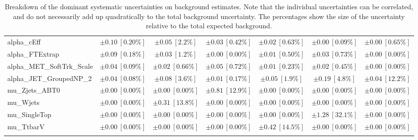 \begin{sidewaystable}
\begin{center}
\begin{tabular*}{\textwidth}{@{\extracolsep{\fill}}lcccccc}
alpha\_cEff         & $\pm 0.10\ [0.20\%] $          & $\pm 0.05\ [2.2\%] $          & $\pm 0.03\ [0.42\%] $          & $\pm 0.02\ [0.63\%] $          & $\pm 0.00\ [0.09\%] $          & $\pm 0.00\ [0.65\%] $       \\
alpha\_FTExtrap         & $\pm 0.09\ [0.18\%] $          & $\pm 0.03\ [1.2\%] $          & $\pm 0.00\ [0.00\%] $          & $\pm 0.01\ [0.50\%] $          & $\pm 0.03\ [0.73\%] $          & $\pm 0.00\ [0.00\%] $       \\
alpha\_MET\_SoftTrk\_Scale         & $\pm 0.04\ [0.09\%] $          & $\pm 0.02\ [0.66\%] $          & $\pm 0.05\ [0.72\%] $          & $\pm 0.01\ [0.23\%] $          & $\pm 0.02\ [0.45\%] $          & $\pm 0.00\ [0.00\%] $       \\
alpha\_JET\_GroupedNP\_2         & $\pm 0.04\ [0.08\%] $          & $\pm 0.08\ [3.6\%] $          & $\pm 0.01\ [0.17\%] $          & $\pm 0.05\ [1.9\%] $          & $\pm 0.19\ [4.8\%] $          & $\pm 0.04\ [12.2\%] $       \\
mu\_Zjets\_ABT0         & $\pm 0.00\ [0.00\%] $          & $\pm 0.00\ [0.00\%] $          & $\pm 0.81\ [12.9\%] $          & $\pm 0.00\ [0.00\%] $          & $\pm 0.00\ [0.00\%] $          & $\pm 0.00\ [0.00\%] $       \\
mu\_Wjets         & $\pm 0.00\ [0.00\%] $          & $\pm 0.31\ [13.8\%] $          & $\pm 0.00\ [0.00\%] $          & $\pm 0.00\ [0.00\%] $          & $\pm 0.00\ [0.00\%] $          & $\pm 0.00\ [0.00\%] $       \\
mu\_SingleTop         & $\pm 0.00\ [0.00\%] $          & $\pm 0.00\ [0.00\%] $          & $\pm 0.00\ [0.00\%] $          & $\pm 0.00\ [0.00\%] $          & $\pm 1.28\ [32.1\%] $          & $\pm 0.00\ [0.00\%] $       \\
mu\_TtbarV         & $\pm 0.00\ [0.00\%] $          & $\pm 0.00\ [0.00\%] $          & $\pm 0.00\ [0.00\%] $          & $\pm 0.42\ [14.5\%] $          & $\pm 0.00\ [0.00\%] $          & $\pm 0.00\ [0.00\%] $       \\
\noalign{\smallskip}\hline\noalign{\smallskip}
\end{tabular*}
\end{center}
\caption[Breakdown of uncertainty on background estimates]{
Breakdown of the dominant systematic uncertainties on background estimates.
Note that the individual uncertainties can be correlated, and do not necessarily add up quadratically to 
the total background uncertainty. The percentages show the size of the uncertainty relative to the total expected background.
\label{table.results.bkgestimate.uncertainties.VRTopAT0_bybkg}}
\end{sidewaystable}
%
